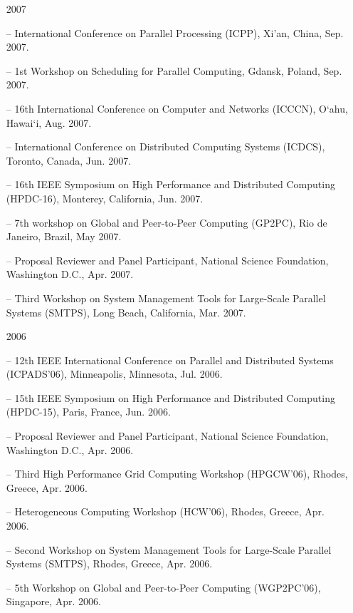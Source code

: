\documentclass[times,11pt]{letter}
\begin{document}
\begin{itemize}
\item [2007]
\item[--]  International Conference on Parallel Processing (ICPP), Xi'an, China, Sep. 2007. 
\item[--]  1st Workshop on Scheduling for Parallel Computing, Gdansk, Poland, Sep. 2007.
\item[--]  16th International Conference on Computer and Networks (ICCCN), O`ahu, Hawai`i, Aug. 2007.
\item[--]  International Conference on Distributed Computing Systems (ICDCS), Toronto, Canada, Jun. 2007.
\item[--]  16th IEEE Symposium on High Performance and Distributed Computing (HPDC-16), Monterey, California, Jun. 2007.
\item[--]  7th workshop on Global and Peer-to-Peer Computing (GP2PC), Rio de Janeiro, Brazil, May 2007. 
\item[--] Proposal Reviewer and Panel Participant, National Science Foundation, Washington D.C., Apr. 2007.
\item[--]  Third Workshop on System Management Tools for Large-Scale Parallel Systems (SMTPS), Long Beach, California, Mar. 2007.

\item [2006]
\item[--]  12th IEEE International Conference on Parallel and Distributed Systems (ICPADS'06), Minneapolis, Minnesota, Jul. 2006.
\item[--]  15th IEEE Symposium on High Performance and Distributed Computing (HPDC-15), Paris, France, Jun. 2006.
\item[--] Proposal Reviewer and Panel Participant, National Science Foundation, Washington D.C., Apr. 2006.
\item[--]  Third High Performance Grid Computing Workshop (HPGCW'06), Rhodes, Greece, Apr. 2006.
\item[--]  Heterogeneous Computing Workshop (HCW'06), Rhodes, Greece, Apr. 2006.
\item[--]  Second Workshop on System Management Tools for Large-Scale Parallel Systems (SMTPS), Rhodes, Greece, Apr. 2006.
\item[--]  5th Workshop on Global and Peer-to-Peer Computing (WGP2PC'06), Singapore, Apr. 2006. 


\end{itemize}
\end{document}
